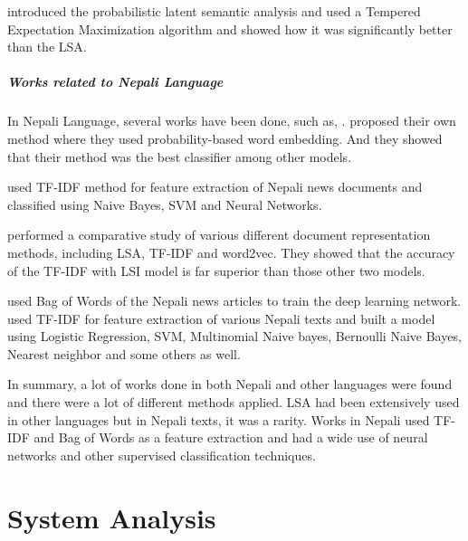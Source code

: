 \documentclass[12pt]{report}
\begin{document}
                            \cite{hofmann2013probabilistic} introduced the probabilistic latent semantic analysis and used a Tempered Expectation Maximization algorithm and showed how it was
                            significantly better than the LSA.         
                    \paragraph{Works related to Nepali Language}

                        In Nepali Language, several works have been done, such as, 
                        \cite{sitaula2021vector,shahi2018nepali,kafle2016improving,subba2019nepali,singh2018nepali}. \cite{sitaula2021vector} proposed their own method where they used probability-based
                        word embedding. And they showed that their method was the best classifier among other models. 
                        
                        \cite{shahi2018nepali} used TF-IDF method for feature extraction of Nepali news documents and classified using Naive Bayes, SVM and Neural Networks. 

                        \cite{kafle2016improving} performed a comparative study of various different document representation methods, including LSA, TF-IDF and word2vec. They showed that the accuracy
                        of the TF-IDF with LSI model is far superior than those other two models. 

                        \cite{subba2019nepali} used Bag of Words\cite{salton1983introduction} of the Nepali news articles to train the deep learning network. \cite{singh2018nepali} used TF-IDF for 
                        feature extraction of various Nepali texts and built a model using Logistic Regression, SVM, Multinomial Naive bayes, Bernoulli Naive Bayes, Nearest neighbor and some others as well.

                        In summary, a lot of works done in both Nepali and other languages were found and there were a lot of different methods applied. LSA had been extensively used in 
                        other languages but in Nepali texts, it was a rarity. Works in Nepali used TF-IDF and Bag of Words as a feature extraction and had a wide use of neural networks and other 
                        supervised classification techniques. 



            \chapter{System Analysis}
\end{document}
